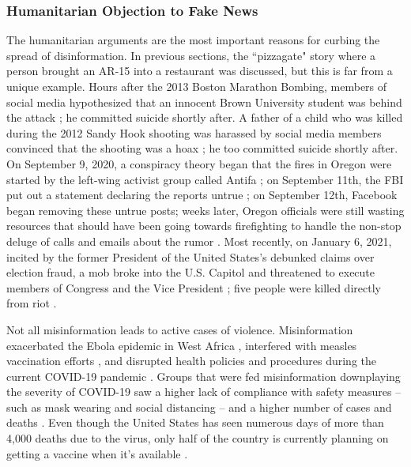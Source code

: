 \documentclass[preprint,review,12pt]{elsarticle}
\begin{document}
\subsubsection{Humanitarian Objection to Fake News}
\label{Humanitarian Objection to Fake News Section}
The humanitarian arguments are the most important reasons for curbing the spread of disinformation. In previous sections, the ``pizzagate" story where a person brought an AR-15 into a restaurant was discussed, but this is far from a unique example. Hours after the 2013 Boston Marathon Bombing, members of social media hypothesized that an innocent Brown University student was behind the attack \cite{starbird2014rumors}; he committed suicide shortly after. A father of a child who was killed during the 2012 Sandy Hook shooting was harassed by social media members convinced that the shooting was a hoax \cite{williamson2019alex}; he too committed suicide shortly after. On September 9, 2020, a conspiracy theory began that the fires in Oregon were started by the left-wing activist group called Antifa \cite{robinson2020oregon}; on September 11th, the FBI put out a statement declaring the reports untrue \cite{fbi2020portland}; on September 12th, Facebook began removing these untrue posts; weeks later, Oregon officials were still wasting resources that should have been going towards firefighting to handle the non-stop deluge of calls and emails about the rumor \cite{wilson2020oregon}. Most recently, on January 6, 2021, incited by the former President of the United States's debunked claims over election fraud, a mob broke into the U.S. Capitol and threatened to execute members of Congress and the Vice President \cite{fandos2021trump}; five people were killed directly from riot \cite{Levenson2021capitol}.

Not all misinformation leads to active cases of violence. Misinformation exacerbated the Ebola epidemic in West Africa \cite{shultz2016role}, interfered with measles vaccination efforts \cite{hussain2018anti}, and disrupted health policies and procedures during the current COVID-19 pandemic \cite{bagherpour2020covid,world2020novel,zarocostas2020fight,depoux2020pandemic,habersaat2020ten,van2020using}. Groups that were fed misinformation downplaying the severity of COVID-19 saw a higher lack of compliance with safety measures -- such as mask wearing and social distancing -- and a higher number of cases and deaths \cite{bursztyn2020misinformation}. Even though the United States has seen numerous days of more than 4,000 deaths due to the virus, only half of the country is currently planning on getting a vaccine when it's available \cite{cornwall2020just}. 
\end{document}
